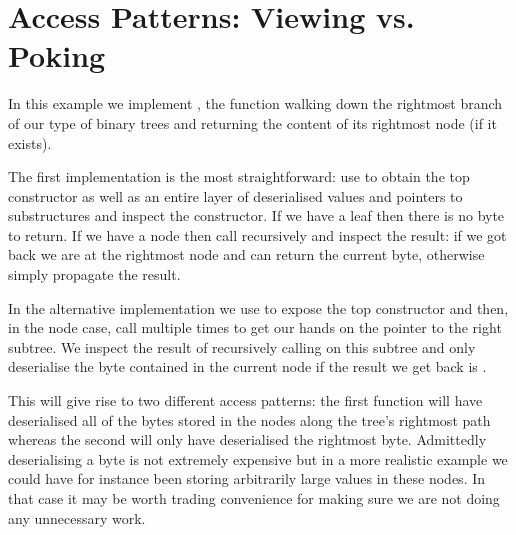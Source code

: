 \section{Access Patterns: Viewing vs. Poking}\label{appendix:rightmost}

In this example we implement , the function walking
down the rightmost branch of our type of binary trees and returning the
content of its rightmost node (if it exists).

The first implementation is the most straightforward: use 
to obtain the top constructor as well as an entire layer of deserialised values
and pointers to substructures and inspect the constructor.
%
If we have a leaf then there is no byte to return.
%
If we have a node then call  recursively and inspect the
result: if we got  back we are at the rightmost node and can
return the current byte, otherwise simply propagate the result.


In the alternative implementation we use  to expose the top
constructor and then, in the node case, call  multiple times
to get our hands on the pointer to the right subtree.
%
We inspect the result of recursively calling  on this
subtree and only deserialise the byte contained in the current node if the result
we get back is .


This will give rise to two different access patterns: the first function will
have deserialised all of the bytes stored in the nodes along the tree's
rightmost path whereas the second will only have deserialised the rightmost byte.
%
Admittedly deserialising a byte is not extremely expensive but in a more realistic
example we could have for instance been storing arbitrarily large values in
these nodes. In that case it may be worth trading convenience for making sure we
are not doing any unnecessary work.
